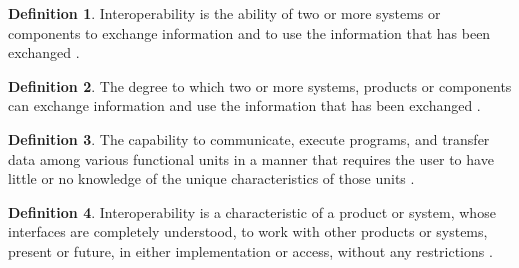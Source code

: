 \documentclass[letterpaper,cleveref]{lipics-v2019}
\theoremstyle{definition}
\newtheorem{defn}{Definition}
\begin{document}
\begin{defn}
Interoperability is the ability of two or more systems or components to exchange information and to use the information that has been exchanged \citep{IEEEComputerDictionary1991}.
\end{defn}
\begin{defn}
The degree to which two or more systems, products or components can exchange information and use the information that has been exchanged \citep{ISO/IEC25010}.
\end{defn}
\begin{defn}
The capability to communicate, execute programs, and transfer data among various functional units in a manner that requires the user to have little or no knowledge of the unique characteristics of those units \citep{ISO/IEC/IEEE24765}.
\end{defn}
\begin{defn}Interoperability is a characteristic of a product or system, whose interfaces are completely understood, to work with other products or systems, present or future, in either implementation or access, without any restrictions \citep{AFUL2019}.
\end{defn}
\end{document}
